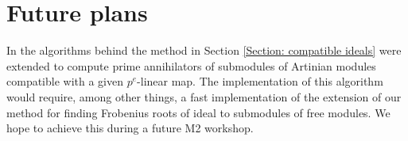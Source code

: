\documentclass[11pt]{amsart}
\begin{document}
\section{Future plans}

In \cite{KatzmanZhangAlgorithm} the algorithms behind the method in Section \ref{Section: compatible ideals} were extended 
to compute prime annihilators of submodules of Artinian modules compatible with a given $p^{e}$-linear map. The implementation of this algorithm
would require, among other things, a fast implementation of the extension of our method for finding Frobenius roots of ideal to submodules of free modules.
We hope to achieve this during a future M2 workshop.




\end{document}
